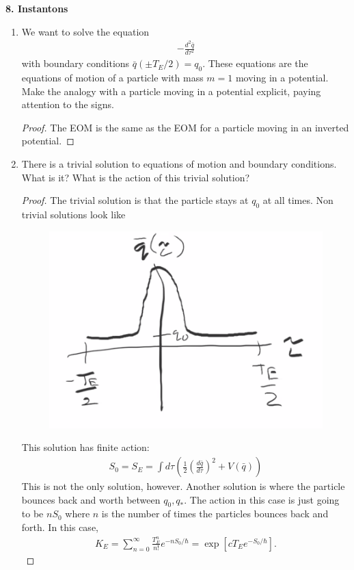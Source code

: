 \documentclass{book}
\theoremstyle{definition}
\newcommand{\f}[2]{\frac{#1}{#2}}
\newcommand{\lp}{\left(}
\newcommand{\rp}{\right)}
\newcommand{\lb}{\left[}
\newcommand{\rb}{\right]}
\begin{document}
\noindent \textbf{8. Instantons} 
\begin{enumerate}
	\item We want to solve the equation 
	\begin{align}
	-\f{d^2\bar{q}}{d\tau^2}
	\end{align}
	with boundary conditions $\bar{q}(\pm T_E/2) = q_0$. These equations are the equations of motion of a particle with mass $m = 1$ moving in
	a potential. Make the analogy with a particle moving in a potential explicit, paying attention to the signs.
	
	\begin{proof}
		The EOM is the same as the EOM for a particle moving in an inverted potential. 
	\end{proof}
	
	
	\item There is a trivial solution to equations of motion and boundary conditions. What
	is it? What is the action of this trivial solution?
	
	\begin{proof}
		The trivial solution is that the particle stays at $q_0$ at all times. Non trivial solutions look like 
		\begin{figure}[!htb]
			\centering
			\includegraphics[scale=0.2]{bound}
		\end{figure}
	
	This solution has finite action:
	\begin{align}
	S_0 = S_E = \int d\tau \lp \f{1}{2}\lp \f{d\bar{q}}{d\tau} \rp^2 + V(\bar{q}) \rp
	\end{align}
	This is not the only solution, however. Another solution is where the particle bounces back and worth between $q_0, q_*$. The action in this case is just going to be $nS_0$ where $n$ is the number of times the particles bounces back and forth. In this case,
	\begin{align}
	K_E = \sum_{n=0}^\infty \f{T_E^n}{n!} e^{-n S_0/\hbar} = \exp\lb cT_E e^{-S_0/\hbar} \rb.
	\end{align}
	 

\end{proof}
\end{enumerate}
\end{document}
